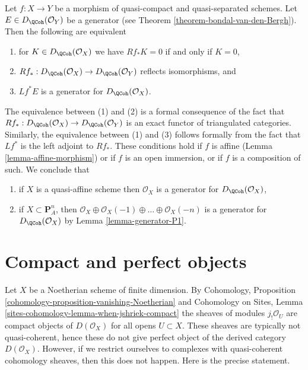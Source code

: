 \begin{remark}
\label{remark-pullback-generator}
Let $f : X \to Y$ be a morphism of quasi-compact and quasi-separated schemes.
Let $E \in D_\QCoh(\mathcal{O}_Y)$ be a generator
(see Theorem \ref{theorem-bondal-van-den-Bergh}).
Then the following are equivalent
\begin{enumerate}
\item for $K \in D_\QCoh(\mathcal{O}_X)$ we have
$Rf_*K = 0$ if and only if $K = 0$,
\item $Rf_* : D_\QCoh(\mathcal{O}_X) \to D_\QCoh(\mathcal{O}_Y)$
reflects isomorphisms, and
\item $Lf^*E$ is a generator for $D_\QCoh(\mathcal{O}_X)$.
\end{enumerate}
The equivalence between (1) and (2) is a formal consequence of the fact that
$Rf_* : D_\QCoh(\mathcal{O}_X) \to D_\QCoh(\mathcal{O}_Y)$ is an
exact functor of triangulated categories. Similarly, the equivalence
between (1) and (3) follows formally from the fact that $Lf^*$
is the left adjoint to $Rf_*$.
These conditions hold if $f$ is affine (Lemma \ref{lemma-affine-morphism})
or if $f$ is an open immersion, or if $f$ is a composition of such.
We conclude that
\begin{enumerate}
\item if $X$ is a quasi-affine scheme then $\mathcal{O}_X$ is a generator
for $D_\QCoh(\mathcal{O}_X)$,
\item if $X \subset \mathbf{P}^n_A$, then
$\mathcal{O}_X \oplus \mathcal{O}_X(-1) \oplus \ldots \oplus \mathcal{O}_X(-n)$
is a generator for $D_\QCoh(\mathcal{O}_X)$ by
Lemma \ref{lemma-generator-P1}.
\end{enumerate}
\end{remark}




\section{Compact and perfect objects}
\label{section-compact}

\noindent
Let $X$ be a Noetherian scheme of finite dimension. By
Cohomology, Proposition \ref{cohomology-proposition-vanishing-Noetherian}
and
Cohomology on Sites, Lemma \ref{sites-cohomology-lemma-when-jshriek-compact}
the sheaves of modules $j_!\mathcal{O}_U$ are compact objects
of $D(\mathcal{O}_X)$ for all opens $U \subset X$.
These sheaves are typically not quasi-coherent, hence these
do not give perfect object of the derived category $D(\mathcal{O}_X)$.
However, if we restrict ourselves to complexes with quasi-coherent
cohomology sheaves, then this does not happen.
Here is the precise statement.

